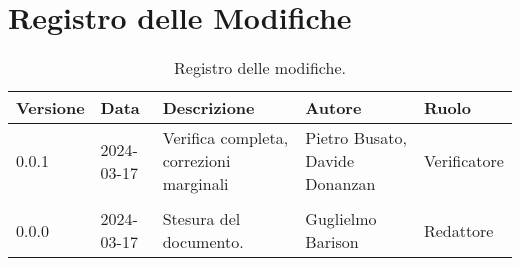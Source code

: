 \section*{Registro delle Modifiche}
\begin{table}[ht!]	
		\centering
		\begin{tabular}{p{1.2cm} p{2cm} p{6cm} p{3cm} p{2cm}}
			\toprule
			\textbf{Versione}& \textbf{Data} & \textbf{Descrizione} & \textbf{Autore} & \textbf{Ruolo} \\
			\midrule
			0.0.1 & 2024-03-17 & Verifica completa, correzioni marginali  & Pietro Busato, Davide Donanzan & Verificatore \\\\
			0.0.0 & 2024-03-17 & Stesura del documento.  & Guglielmo Barison & Redattore \\
			\bottomrule
		\end{tabular}
		\caption{Registro delle modifiche.}
		\label{table:Registro delle modifiche}
\end{table}
